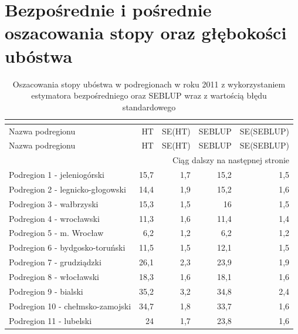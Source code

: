 \newpage

\section{Bezpośrednie i pośrednie oszacowania stopy oraz głębokości ubóstwa}

\begin{center}
\footnotesize
\begin{longtable}{p{6cm}rrrr}
\caption{Oszacowania stopy ubóstwa w podregionach w roku 2011 z wykorzystaniem estymatora bezpośredniego oraz SEBLUP wraz z wartością błędu standardowego}\\
\label{tab:podreg_hcr}\\
\hline
Nazwa podregionu & HT & SE(HT) & SEBLUP & SE(SEBLUP) \\
  \hline
\endfirsthead
  \hline
Nazwa podregionu & HT & SE(HT) & SEBLUP & SE(SEBLUP) \\
  \hline
\endhead
\hline \multicolumn{5}{|r|}{{Ciąg dalszy na następnej stronie}} \\
\hline
\endfoot
\hline
\endlastfoot
\hline
Podregion 1 - jeleniogórski              & 15,7    & 1,7         & 15,2     & 1,5          \\
Podregion 2 - legnicko-głogowski         & 14,4    & 1,9         & 15,2     & 1,6          \\
Podregion 3 - wałbrzyski                 & 15,3    & 1,5         & 16       & 1,5          \\
Podregion 4 - wrocławski                 & 11,3    & 1,6         & 11,4     & 1,4          \\
Podregion 5 - m. Wrocław                 & 6,2     & 1,2         & 6,2      & 1,2          \\
Podregion 6 - bydgosko-toruński          & 11,5    & 1,5         & 12,1     & 1,5          \\
Podregion 7 - grudziądzki                & 26,1    & 2,3         & 23,9     & 1,9          \\
Podregion 8 - włocławski                 & 18,3    & 1,6         & 18,1     & 1,6          \\
Podregion 9 - bialski                    & 35,2    & 3,2         & 34,8     & 2,4          \\
Podregion 10 - chełmsko-zamojski         & 34,7    & 1,8         & 33,7     & 1,6          \\
Podregion 11 - lubelski                  & 24      & 1,7         & 23,8     & 1,6          \\

\end{longtable}
\end{center}
